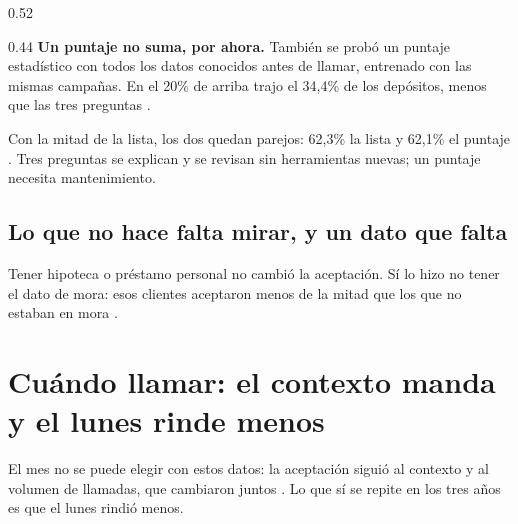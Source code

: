 \documentclass[10pt,a4paper]{article}
\begin{document}
\noindent\begin{columna}{0.52\linewidth}
\end{columna}\hfill
\begin{columna}{0.44\linewidth}
\textbf{Un puntaje no suma, por ahora.} También se probó un puntaje estadístico con todos
los datos conocidos antes de llamar, entrenado con las mismas campañas. En el 20\% de
arriba trajo el 34,4\% de los depósitos, menos que las tres preguntas .

Con la mitad de la lista, los dos quedan parejos: 62,3\% la lista y 62,1\% el puntaje
. Tres preguntas se explican y se revisan sin herramientas nuevas; un puntaje
necesita mantenimiento.
\end{columna}

\subsection{Lo que no hace falta mirar, y un dato que falta}

Tener hipoteca o préstamo personal no cambió la aceptación. Sí lo hizo no tener el dato de
mora: esos clientes aceptaron menos de la mitad que los que no estaban en mora .


\newpage
\section{Cuándo llamar: el contexto manda y el lunes rinde menos}\label{sec:cuando}

El mes no se puede elegir con estos datos: la aceptación siguió al contexto y al volumen
de llamadas, que cambiaron juntos . Lo que sí se repite en los tres años es que
el lunes rindió menos.

\end{document}
